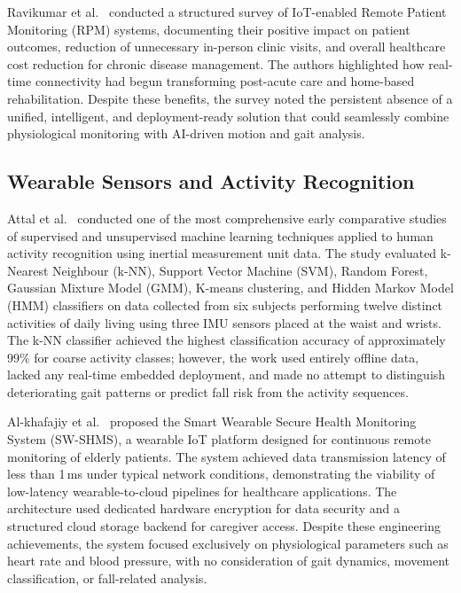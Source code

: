 \documentclass[conference]{IEEEtran}
\begin{document}
Ravikumar et al.~\cite{ravikumar2023} conducted a structured survey of
IoT-enabled Remote Patient Monitoring (RPM) systems, documenting their
positive impact on patient outcomes, reduction of unnecessary in-person
clinic visits, and overall healthcare cost reduction for chronic disease
management. The authors highlighted how real-time connectivity had begun
transforming post-acute care and home-based rehabilitation. Despite these
benefits, the survey noted the persistent absence of a unified, intelligent,
and deployment-ready solution that could seamlessly combine physiological
monitoring with AI-driven motion and gait analysis.

\subsection{Wearable Sensors and Activity Recognition}

Attal et al.~\cite{attal2015} conducted one of the most comprehensive
early comparative studies of supervised and unsupervised machine learning
techniques applied to human activity recognition using inertial measurement
unit data. The study evaluated k-Nearest Neighbour (k-NN), Support Vector
Machine (SVM), Random Forest, Gaussian Mixture Model (GMM), K-means
clustering, and Hidden Markov Model (HMM) classifiers on data collected
from six subjects performing twelve distinct activities of daily living
using three IMU sensors placed at the waist and wrists. The k-NN classifier
achieved the highest classification accuracy of approximately 99\% for
coarse activity classes; however, the work used entirely offline data,
lacked any real-time embedded deployment, and made no attempt to distinguish
deteriorating gait patterns or predict fall risk from the activity sequences.

Al-khafajiy et al.~\cite{alkhafajiy2019} proposed the Smart Wearable
Secure Health Monitoring System (SW-SHMS), a wearable IoT platform designed
for continuous remote monitoring of elderly patients. The system achieved
data transmission latency of less than 1\,ms under typical network
conditions, demonstrating the viability of low-latency wearable-to-cloud
pipelines for healthcare applications. The architecture used dedicated
hardware encryption for data security and a structured cloud storage
backend for caregiver access. Despite these engineering achievements, the
system focused exclusively on physiological parameters such as heart rate
and blood pressure, with no consideration of gait dynamics, movement
classification, or fall-related analysis.
\end{document}
